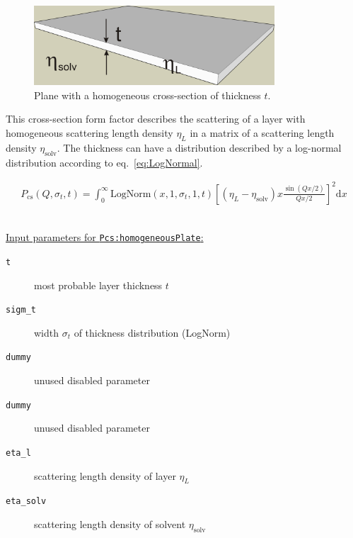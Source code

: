 \begin{figure}[htb]
\begin{center}
\includegraphics[width=0.802\textwidth,height=0.265\textwidth]{../images/form_factor/anisotropic/Pcs_homogeneousXS_txt.png}
\end{center}
\caption{Plane with a homogeneous cross-section of thickness $t$.}
\label{fig:homogeneousXS}
\end{figure}

This cross-section form factor describes the scattering of a layer with homogeneous
scattering length density $\eta_L$ in a matrix of a scattering length density $\eta_\textrm{solv}$.
The thickness can have a distribution described by a log-normal distribution according to eq.\ \ref{eq:LogNormal}.

\begin{align}
P_\text{cs}(Q,\sigma_{t},t) = \int_0^\infty \textrm{LogNorm}(x,1,\sigma_{t},1,t)
    \left[ \left(\eta_L-\eta_\textrm{solv}\right) x \frac{\sin(Qx/2)}{Qx/2} \right]^2\textrm{d}x
\label{eq:PcsHomogeneousPlate}
\end{align}

\vspace{5mm}

\hspace{1pt}\\
\uline{Input parameters for \texttt{Pcs:homogeneousPlate}:}
\begin{description}
    \item[\texttt{t}] most probable layer thickness $t$
    \item[\texttt{sigm\_t}] width $\sigma_t$ of thickness distribution (LogNorm)
    \item[\texttt{dummy}] unused disabled parameter
    \item[\texttt{dummy}] unused disabled parameter
    \item[\texttt{eta\_l}] scattering length density of layer $\eta_L$
    \item[\texttt{eta\_solv}] scattering length density of solvent $\eta_\textrm{solv}$
\end{description}

